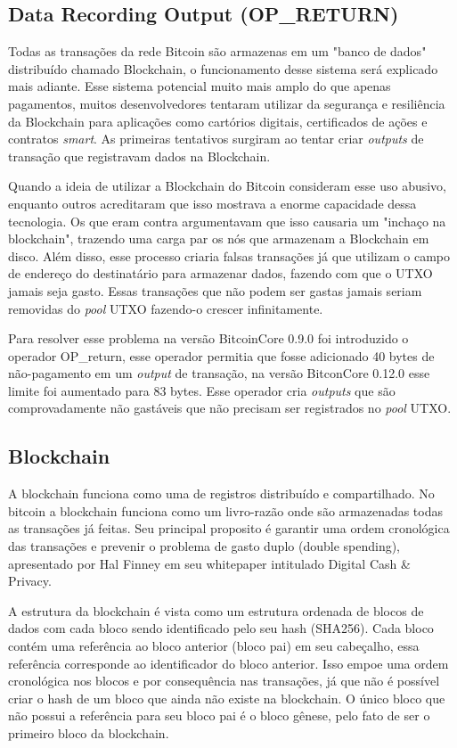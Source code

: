 \documentclass[conference,compsoc]{IEEEtran}
\begin{document}
\subsection*{Data Recording Output (OP\_RETURN)}

Todas as transações da rede Bitcoin são armazenas em um "banco de dados" distribuído chamado Blockchain, o funcionamento desse sistema será explicado mais adiante. Esse sistema potencial muito mais amplo do que apenas pagamentos, muitos desenvolvedores tentaram utilizar da segurança e resiliência da Blockchain para aplicações como cartórios digitais, certificados de ações e contratos \textit{smart}. As primeiras tentativos surgiram ao tentar criar \textit{outputs} de transação que registravam dados na Blockchain.

Quando a ideia de utilizar a Blockchain do Bitcoin  consideram esse uso abusivo, enquanto outros acreditaram que isso mostrava a enorme capacidade dessa tecnologia. Os que eram contra argumentavam que isso causaria um "inchaço na blockchain", trazendo uma carga par os nós que armazenam a Blockchain em disco. Além disso, esse processo criaria  falsas transações já que utilizam o campo de endereço do destinatário para armazenar dados, fazendo com que o UTXO jamais seja gasto. Essas transações que não podem ser gastas jamais seriam removidas do \textit{pool} UTXO fazendo-o crescer infinitamente. 

Para resolver esse problema na versão BitcoinCore 0.9.0 foi introduzido o operador OP\_return, esse operador permitia que fosse adicionado 40 bytes de não-pagamento em um \textit{output} de transação, na versão BitconCore 0.12.0 esse limite foi aumentado para 83 bytes. Esse operador cria \textit{outputs} que são comprovadamente não gastáveis que não precisam ser registrados no \textit{pool} UTXO.


\subsection{Blockchain}
A blockchain funciona como uma de registros distribuído e compartilhado. No bitcoin a blockchain funciona como um livro-razão onde são armazenadas todas as transações já feitas. Seu principal proposito é garantir uma ordem cronológica das transações e prevenir o problema de gasto duplo (double spending), apresentado por Hal Finney em seu whitepaper intitulado Digital Cash \& Privacy. 

A estrutura da blockchain é vista como um estrutura ordenada de blocos de dados com cada bloco sendo identificado pelo seu hash (SHA256). Cada bloco contém uma referência ao bloco anterior (bloco pai) em seu cabeçalho, essa referência corresponde ao identificador do bloco anterior. Isso empoe uma ordem cronológica nos blocos e por consequência nas transações, já que não é possível criar o hash de um bloco que ainda não existe na blockchain. O único bloco que não possui a referência para seu bloco pai é o bloco gênese, pelo fato de ser o primeiro bloco da blockchain. 
\end{document}
